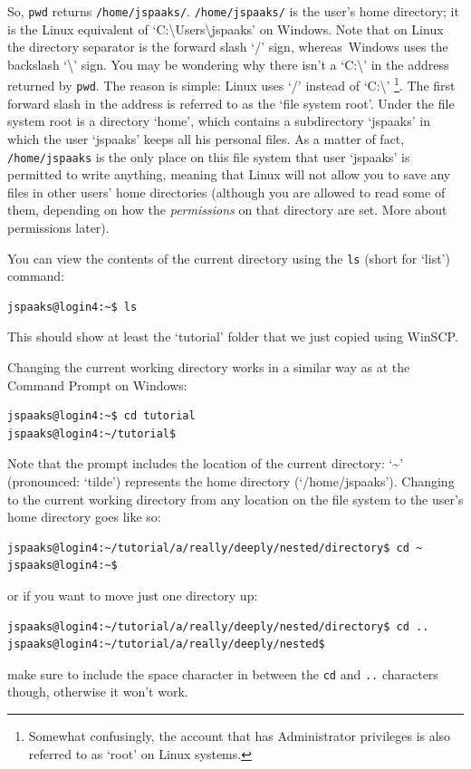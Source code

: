 So, \texttt{pwd} returns \texttt{/home/jspaaks/}. \texttt{/home/jspaaks/} is the user's home directory; it is the Linux equivalent of `C:\textbackslash{}Users\textbackslash{}jspaaks' on Windows. Note that on Linux the directory separator  is the forward slash `/' sign, whereas~Windows uses the backslash `\textbackslash{}' sign. You may be wondering why there isn't a `C:\textbackslash{}' in the address returned by \texttt{pwd}. The reason is simple: Linux uses `/' instead of `C:\textbackslash{}' \footnote{Somewhat confusingly, the account that has Administrator privileges is also referred to as `root' on Linux systems.}. The first forward slash in the address is referred to as the `file system root'. Under the file system root is a directory `home', which contains a subdirectory `jspaaks' in which the user `jspaaks' keeps all his personal files. As a matter of fact, \texttt{/home/jspaaks} is the only place on this file system that user `jspaaks' is permitted to write anything, meaning that Linux will not allow you to save any files in other users' home directories (although you are allowed to read some of them, depending on how the \textit{permissions} on that directory are set. More about permissions later).

You can view the contents of the current directory using the \texttt{ls} (short for `list') command:
\begin{lstlisting}[style=basic,style=bash]
jspaaks@login4:~$ ls
\end{lstlisting}
This should show at least the `tutorial' folder that we just copied using WinSCP.

Changing the current working directory works in a similar way as at the Command Prompt on Windows:
\begin{lstlisting}[style=basic,style=bash]
jspaaks@login4:~$ cd tutorial
jspaaks@login4:~/tutorial$ 
\end{lstlisting}
Note that the prompt includes the location of the current directory: `\textasciitilde' (pronounced: `tilde') represents the home directory (`/home/jspaaks').
Changing to the current working directory from any location on the file system to the user's home directory goes like so:
\begin{lstlisting}[style=basic,style=bash]
jspaaks@login4:~/tutorial/a/really/deeply/nested/directory$ cd ~
jspaaks@login4:~$ 
\end{lstlisting}
or if you want to move just one directory up:
\begin{lstlisting}[style=basic,style=bash]
jspaaks@login4:~/tutorial/a/really/deeply/nested/directory$ cd ..
jspaaks@login4:~/tutorial/a/really/deeply/nested$ 
\end{lstlisting}
make sure to include the space character in between the \texttt{cd} and \texttt{..} characters though, otherwise it won't work.

